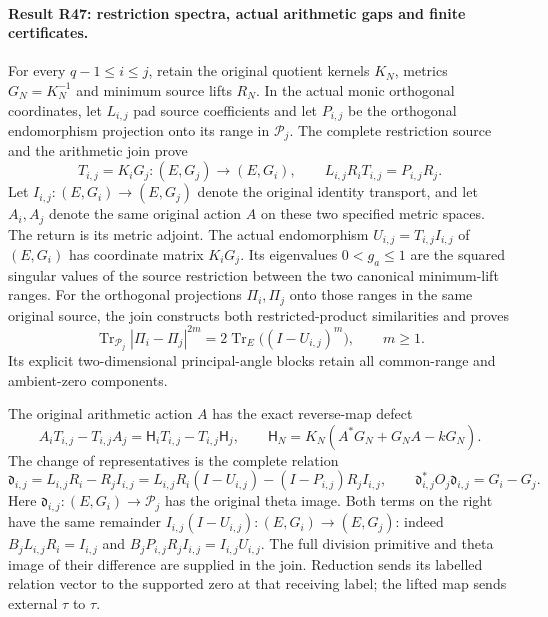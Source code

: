\paragraph{Result R47: restriction spectra, actual arithmetic gaps and finite certificates.}
For every $q-1\le i\le j$, retain the original quotient kernels
$K_N$, metrics $G_N=K_N^{-1}$ and minimum source lifts $R_N$.
In the actual monic orthogonal coordinates, let $L_{i,j}$ pad source
coefficients and let $P_{i,j}$ be the orthogonal endomorphism
projection onto its range in $\mathcal P_j$. The complete
restriction source and the arithmetic join prove
\[
 T_{i,j}=K_iG_j:(E,G_j)\longrightarrow(E,G_i),\qquad
 L_{i,j}R_iT_{i,j}=P_{i,j}R_j.
\]
Let $I_{i,j}:(E,G_i)\to(E,G_j)$ denote the original identity
transport, and let $A_i,A_j$ denote the same original action $A$
on these two specified metric spaces. The return is its metric
adjoint. The actual endomorphism
$U_{i,j}=T_{i,j}I_{i,j}$ of $(E,G_i)$ has coordinate matrix
$K_iG_j$. Its eigenvalues $0<g_a\le1$
are the squared singular values of the source restriction between
the two canonical minimum-lift ranges. For the orthogonal projections
$\Pi_i,\Pi_j$ onto those ranges in the same original source, the
join constructs both restricted-product similarities and proves
\[
 \operatorname{Tr}_{\mathcal P_j}|\Pi_i-\Pi_j|^{2m}
   =2\operatorname{Tr}_E\bigl((I-U_{i,j})^m\bigr),
 \qquad m\ge1.
\]
Its explicit two-dimensional principal-angle blocks retain all
common-range and ambient-zero components.

The original arithmetic action $A$ has the exact reverse-map defect
\[
 A_iT_{i,j}-T_{i,j}A_j
  =\mathsf H_iT_{i,j}-T_{i,j}\mathsf H_j,
 \qquad
 \mathsf H_N=K_N(A^*G_N+G_NA-kG_N).
\]
The change of representatives is the complete relation
\[
 \mathfrak d_{i,j}=L_{i,j}R_i-R_jI_{i,j}
   =L_{i,j}R_i(I-U_{i,j})-(I-P_{i,j})R_jI_{i,j},
 \qquad
 \mathfrak d_{i,j}^*O_j\mathfrak d_{i,j}=G_i-G_j.
\]
Here $\mathfrak d_{i,j}:(E,G_i)\to\mathcal P_j$ has the
original theta image. Both terms on the right have the same
remainder $I_{i,j}(I-U_{i,j}):(E,G_i)\to(E,G_j)$:
indeed $B_jL_{i,j}R_i=I_{i,j}$ and
$B_jP_{i,j}R_jI_{i,j}=I_{i,j}U_{i,j}$. The full division primitive and theta image of their
difference are supplied in the join. Reduction sends its labelled
relation vector to the supported zero at that receiving label;
the lifted map sends external $\tau$ to $\tau$.

